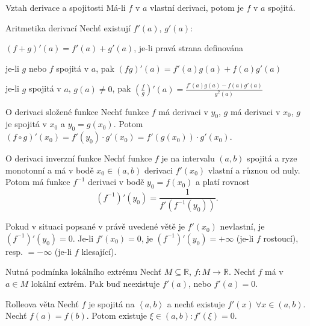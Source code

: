 \begin{vetaN}{Vztah derivace a spojitosti}
Má-li $f$ v $a$ vlastní derivaci, potom je $f$ v $a$ spojitá.
\end{vetaN}

\begin{vetaN}{Aritmetika derivací}
Nechť existují $f'(a)$, $g'(a)$:
\begin{penumerate}
	\item $(f+g)'(a)=f'(a)+g'(a)$, je-li pravá strana definována
	\item je-li $g$ nebo $f$ spojitá v $a$, pak $(fg)'(a)=f'(a)g(a)+f(a)g'(a)$
	\item je-li $g$ spojitá v $a$, $g(a) \neq 0$, pak $(\frac{f}{g})'(a)=\frac{f'(a)g(a)-f(a)g'(a)}{g^2(a)}$
\end{penumerate}
\end{vetaN}

\begin{vetaN}{O derivaci složené funkce}
Nechť funkce $f$ má derivaci v $y_0$, $g$ má derivaci v $x_0$, $g$ je spojitá v $x_0$ a $y_0=g(x_0)$. Potom $(f \circ g)'(x_0)=f'(y_0)\cdot g'(x_0)=f'(g(x_0))\cdot g'(x_0)$.
\end{vetaN}

\begin{vetaN}{O derivaci inverzní funkce}
Nechť funkce $f$ je na intervalu $(a,b)$ spojitá a ryze monotonní a má v bodě $x_0 \in (a,b)$ derivaci $f'(x_0)$ vlastní a různou od nuly. Potom má funkce $f^{-1}$ derivaci v bodě $y_0=f(x_0)$ a platí rovnost
$$(f^{-1})'(y_0) = \frac{1}{f'(f^{-1}(y_0))}.$$
\begin{poznamka}
Pokud v situaci popsané v právě uvedené větě je $f'(x_0)$ nevlastní, je $(f^{-1})'(y_0)=0$. Je-li $f'(x_0)=0$, je $(f^{-1})'(y_0)=+\infty$ (je-li $f$ rostoucí), resp. $=-\infty$ (je-li $f$ klesající).
\end{poznamka}
\end{vetaN}

\begin{vetaN}{Nutná podmínka lokálního extrému}
Nechť $M \subseteq \mathbb{R}$, $f: M \rightarrow \mathbb{R}$. Nechť $f$ má v $a \in M$ lokální extrém. Pak buď neexistuje $f'(a)$, nebo $f'(a)=0$.
\end{vetaN}

\begin{vetaN}{Rolleova věta}
Nechť $f$ je spojitá na $\left<a, b\right>$ a nechť existuje $f'(x)\ \forall x \in (a,b)$. Nechť $f(a)=f(b)$. Potom existuje $\xi \in (a,b): f'(\xi)=0$.
\end{vetaN}

